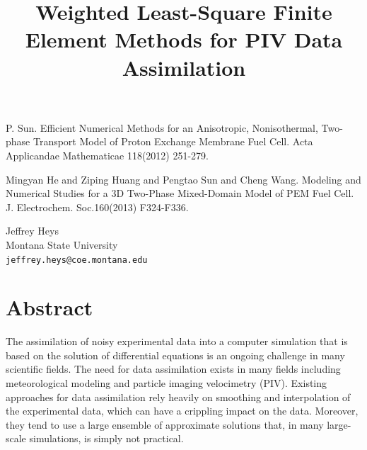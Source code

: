 \documentclass[article, A4, 11pt]{llncs}%
\begin{document}

\begin{thebibliography}{10}
{\sc P. Sun}. {Efficient Numerical Methods for an Anisotropic, Nonisothermal, Two-phase Transport Model of Proton Exchange Membrane Fuel Cell}. Acta Applicandae Mathematicae 118(2012) 251-279.

{\sc Mingyan He and Ziping Huang and Pengtao Sun and Cheng Wang}. {Modeling and Numerical Studies for a 3D Two-Phase Mixed-Domain Model of PEM Fuel Cell}. J. Electrochem. Soc.160(2013) F324-F336.
\end{thebibliography} %

\title{Weighted Least-Square Finite Element Methods for PIV Data Assimilation}
 \author{} \institute{}
\maketitle
\begin{center}
{\large Jeffrey Heys}\\
Montana State University\\
{\tt jeffrey.heys@coe.montana.edu}
\end{center}

\section*{Abstract}
The assimilation of noisy experimental data into a computer simulation that is based on the solution of differential equations is an ongoing challenge in many scientific fields. The need for data assimilation exists in many fields including meteorological modeling and particle imaging velocimetry (PIV). Existing approaches for data assimilation rely heavily on smoothing and interpolation of the experimental data, which can have a crippling impact on the data. Moreover, they tend to use a large ensemble of approximate solutions that, in many large-scale simulations, is simply not practical.
\end{document}
